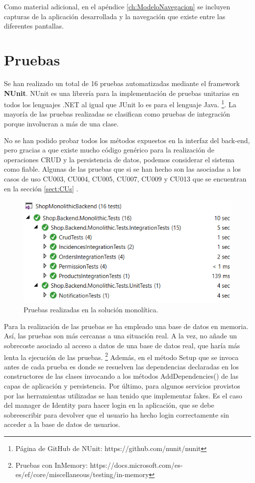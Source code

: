 \documentclass[11pt,spanish,listoffigures]{tfgetsinf}
\begin{document}
\begin{itemize}
\end{itemize}

Como material adicional, en el apéndice \ref{ch:ModeloNavegacion}  se incluyen capturas de la aplicación desarrollada y la navegación que existe entre las diferentes pantallas.

\section{Pruebas}

Se han realizado un total de 16 pruebas automatizadas mediante el framework \textbf{NUnit}. NUnit es una librería para la implementación de pruebas unitarias en todos los lenguajes .NET al igual que JUnit lo es para el lenguaje Java. \footnote{ Página de GitHub de NUnit: https://github.com/nunit/nunit}. La mayoría de las pruebas realizadas se clasifican como pruebas de integración porque involucran a más de una clase. 

No se han podido probar todos los métodos expuestos en la interfaz del back-end, pero gracias a que existe mucho código genérico para la realización de operaciones CRUD y la persistencia de datos, podemos considerar el sistema como fiable. Algunas de las pruebas que si se han hecho son las asociadas a los casos de uso CU003, CU004, CU005, CU007, CU009 y CU013 que se encuentran en la sección \ref{sect:CUs} .

\begin{figure}[h]
\centering
\includegraphics[scale=0.8]{Tests}
\caption{Pruebas realizadas en la solución monolítica.}
\end{figure}

Para la realización de las pruebas se ha empleado una base de datos en memoria. Así, las pruebas son más cercanas a una situación real. A la vez, no añade un sobrecoste asociado al acceso a datos de una base de datos real, que haría más lenta la ejecución de las pruebas. \footnote{ Pruebas con InMemory: https://docs.microsoft.com/es-es/ef/core/miscellaneous/testing/in-memory} Además, en el método Setup que se invoca antes de cada prueba es donde se resuelven las dependencias declaradas en los constructores de las clases invocando a los métodos AddDependencies() de las capas de aplicación y persistencia. Por último, para algunos servicios provistos por las herramientas utilizadas se han tenido que implementar fakes. Es el caso del manager de Identity para hacer login en la aplicación, que se debe sobreescribir para devolver que el usuario ha hecho login correctamente sin acceder a la base de datos de usuarios.
\end{document}
